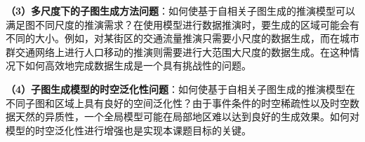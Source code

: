 \documentclass[12pt,UTF8,AutoFakeBold=2,a4paper]{ctexart} %
\begin{document}
\textbf{（3）多尺度下的子图生成方法问题}：如何使基于自相关子图生成的推演模型可以满足图不同尺度的推演需求？在使用模型进行数据推演时，要生成的区域可能会有不同的大小。例如，对某街区的交通流量推演只需要小尺度的数据生成，而在城市群交通网络上进行人口移动的推演则需要进行大范围大尺度的数据生成。在这种情况下如何高效地完成数据生成是一个具有挑战性的问题。

\textbf{（4）子图生成模型的时空泛化性问题}：如何使基于自相关子图生成的推演模型在不同子图和区域上具有良好的空间泛化性？由于事件条件的时空稀疏性以及时空数据天然的异质性，一个全局模型可能在局部地区难以达到良好的生成效果。如何对模型的时空泛化性进行增强也是实现本课题目标的关键。




\end{document}
